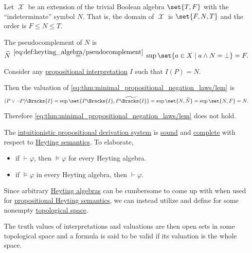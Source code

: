 \begin{example}\label{ex:heyting_semantics_lem_counterexample}
  Let \( \mscrX \) be an extension of the trivial Boolean algebra \( \set{ T, F } \) with the \enquote{indeterminate} symbol \( N \). That is, the domain of \( \mscrX \) is \( \set{ F, N, T } \) and the order is \( F \leq N \leq T \).

  The pseudocomplement of \( N \) is
  \begin{equation*}
    \widetilde{N}
    \reloset {\eqref{eq:def:heyting_algebra/pseudocomplement}} =
    \sup\set{ a \in X \given a \wedge N = \bot }
    =
    F.
  \end{equation*}

  Consider any \hyperref[def:propositional_valuation]{propositional interpretation} \( I \) such that \( I(P) = N \).

  Then the valuation of \eqref{eq:thm:minimal_propositional_negation_laws/lem} is
  \begin{equation*}
    (P \vee \neg P)\Bracks{I}
    =
    \sup\set{ P\Bracks{I}, \widetilde{P\Bracks{I}} }
    =
    \sup\set{ N, \widetilde{N} }
    =
    \sup\set{ N, F }
    =
    N.
  \end{equation*}

  Therefore \eqref{eq:thm:minimal_propositional_negation_laws/lem} does not hold.
\end{example}

\begin{theorem}\label{thm:intuitionistic_propositional_logic_is_sound_and_complete}
  The \hyperref[def:intuitionistic_propositional_derivation_system]{intuitionistic propositional derivation system} is \hyperref[def:derivability_and_satisfiability/soundness]{sound} and \hyperref[def:derivability_and_satisfiability/completeness]{complete} with respect to \hyperref[def:propositional_heyting_algebra_semantics]{Heyting semantics}. To elaborate,
  \begin{itemize}
    \item if \( \vdash \varphi \), then \( \vDash \varphi \) for every Heyting algebra.
    \item if \( \vDash \varphi \) in every Heyting algebra, then \( \vdash \varphi \).
  \end{itemize}
\end{theorem}

\begin{definition}\label{def:propositional_topological_semantics}
  Since arbitrary \hyperref[def:heyting_algebra]{Heyting algebras} can be cumbersome to come up with when used for \hyperref[def:propositional_heyting_algebra_semantics]{propositional Heyting semantics}, we can instead utilize  and define  for some nonempty \hyperref[def:topological_space]{topological space}.

  The truth values of interpretations and valuations are then open sets in some topological space and a formula is said to be valid if its valuation is the whole space.
\end{definition}

